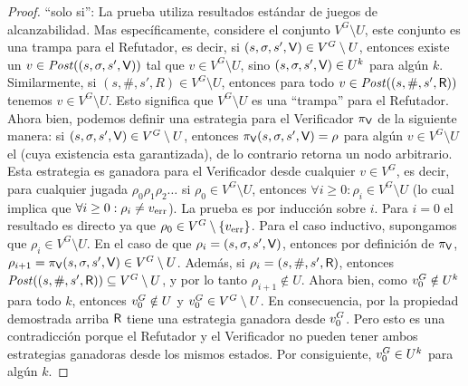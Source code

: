 \iffalse
\begin{proof} 
``solo si'': La prueba utiliza resultados estándar de juegos de alcanzabilidad. Mas específicamente, considere el conjunto $V^G \setminus U$, este conjunto es una trampa para el Refutador, es decir, si $(s,\sigma, s', \mathsf{V}) \in V^G \setminus U$, entonces existe un $v \in \mathit{Post}((s,\sigma, s', \mathsf{V}))$ tal que 
$v \in V^G \setminus U$, sino
$(s,\sigma, s', \mathsf{V}) \in U^k$ para algún $k$. Similarmente, si $(s,\#, s', R) \in V^G \setminus U$, entonces para todo $v \in \mathit{Post}((s,\#, s', \mathsf{R}))$ 
tenemos $v \in V^G \setminus U$. Esto significa que $V^G \setminus U$ es una ``trampa'' para el Refutador. 
Ahora bien, podemos definir una estrategia para el Verificador $\pi_{\mathsf{V}}$ de la siguiente manera: si $(s, \sigma, s', \mathsf{V}) \in V^G \setminus U$, entonces
$\pi_{\mathsf{V}}(s, \sigma, s', \mathsf{V}) = \rho$ para algún $v \in V^G \setminus U$ el (cuya existencia esta garantizada), de lo contrario retorna un nodo arbitrario. 
Esta estrategia es ganadora para el Verificador desde cualquier $v \in V^G$, es decir, para cualquier jugada $\rho_0 \rho_1 \rho_2 \dots$ 
si $\rho_0 \in V^G \setminus U$, entonces $\forall i \geq 0: \rho_i \in V^G \setminus U$ 
(lo cual implica que $\forall i \geq 0: \rho_i \neq v_{\text{err}}$). 
La prueba es por inducción sobre $i$. Para $i=0$ el resultado es directo ya que $\rho_0 \in V^G \setminus \{v_{\text{err}}\}$. Para el caso inductivo,
supongamos que $\rho_i \in V^G \setminus U$. En el caso de que $\rho_i = (s, \sigma, s', \mathsf{V})$, entonces por definición de $\pi_{\mathsf{V}}$, 
$\rho_{i+1} = \pi_{\mathsf{V}}(s,\sigma, s', \mathsf{V}) \in V^G \setminus U$.
Además, si $\rho_i = (s, \#, s', \mathsf{R})$, entonces $\mathit{Post}((s, \#, s', \mathsf{R})) \subseteq V^G \setminus U$, 
y por lo tanto $\rho_{i+1} \notin U$. 
Ahora bien, como $v_0^G \notin U^k$ para todo $k$, entonces $v_0^G \notin U$ y $v_0^G \in V^G \setminus U$. 
En consecuencia, por la propiedad demostrada arriba $\mathsf{R}$ tiene una estrategia ganadora desde 
$v_0^G$. Pero esto es una contradicción porque el Refutador y el Verificador no pueden tener ambos estrategias ganadoras desde los mismos estados.
Por consiguiente, $v_0^G \in U^k$ para algún $k$.
	

\end{proof}

